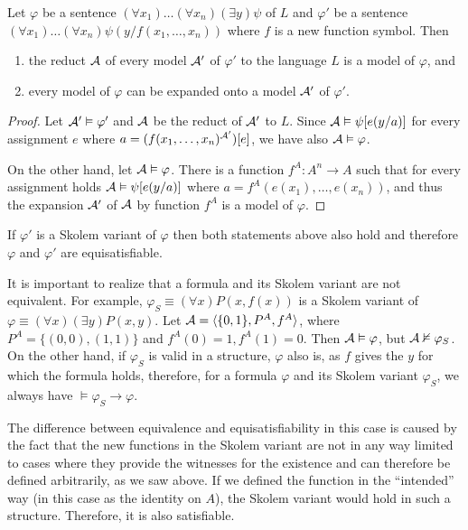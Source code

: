 \begin{lemma}
Let $\varphi$ be a sentence $(\forall x_1)\dots(\forall x_n)(\exists y)\psi$ of $L$ and $\varphi'$ be a sentence $(\forall x_1)\dots(\forall x_n)\psi(y/f(x_1, \dots, x_n))$ where $f$ is a new function symbol. Then
\begin{enumerate}
	\item the reduct $\mathcal{A}$ of every model $\mathcal{A}'$ of $\varphi'$ to the language $L$ is a model of $\varphi$, and
	\item every model of $\varphi$ can be expanded onto a model $\mathcal{A}'$ of $\varphi'$.
\end{enumerate}
\end{lemma}
\begin{proof}
Let $\mathcal{A}' \vDash \varphi'$ and $\mathcal{A}$ be the reduct of $\mathcal{A}'$ to $L$. Since $\mathcal{A} \vDash \psi[e(y/a)]$ for every assignment $e$ where $a = (f(x_1, \dots, x_n)^{\mathcal{A}'})[e]$, we have also $\mathcal{A} \vDash \varphi$.

On the other hand, let $\mathcal{A} \vDash \varphi$. There is a function $f^A: A^n \to A$ such that for every assignment holds $\mathcal{A} \vDash \psi[e(y/a)]$ where $a = f^A(e(x_1), \dots, e(x_n))$, and thus the expansion $\mathcal{A}'$ of $\mathcal{A}$ by function $f^A$ is a model of $\varphi$.
\end{proof}

If $\varphi'$ is a Skolem variant of $\varphi$ then both statements above also hold and therefore $\varphi$ and $\varphi'$ are equisatisfiable.

It is important to realize that a formula and its Skolem variant are not equivalent. For example, $\varphi_S \equiv (\forall x)P(x,f(x))$ is a Skolem variant of $\varphi \equiv (\forall x)(\exists y)P(x,y)$. Let $\mathcal{A} =\langle \{0,1\}, P^A, f^A \rangle$, where $P^A = \{(0,0), (1,1)\}$ and $f^A(0)=1, f^A(1)=0$. Then $\mathcal{A} \vDash \varphi$, but $\mathcal{A} \nvDash \varphi_S$. On the other hand, if $\varphi_S$ is valid in a structure, $\varphi$ also is, as $f$ gives the $y$ for which the formula holds, therefore, for a formula $\varphi$ and its Skolem variant $\varphi_S$, we always have $\vDash \varphi_S \to \varphi$. 

The difference between equivalence and equisatisfiability in this case is caused by the fact that the new functions in the Skolem variant are not in any way limited to cases where they provide the witnesses for the existence and can therefore be defined arbitrarily, as we saw above. If we defined the function in the ``intended'' way (in this case as the identity on $A$), the Skolem variant would hold in such a structure. Therefore, it is also satisfiable.

